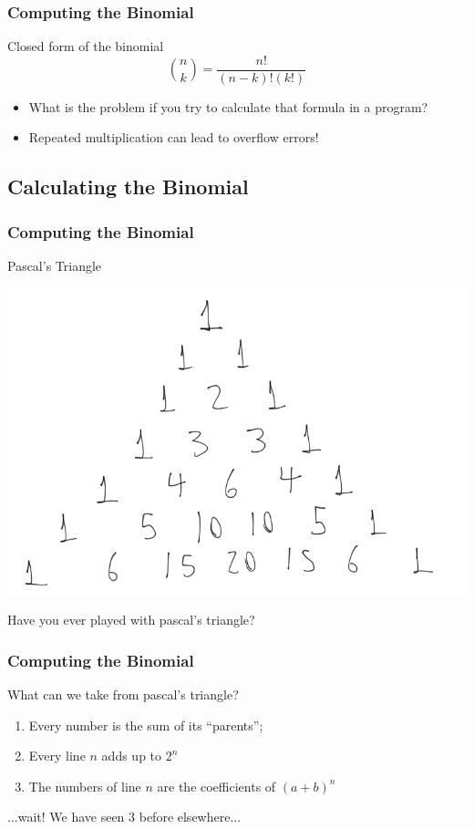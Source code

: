 \documentclass{beamer}
\begin{document}
\begin{frame}
  \frametitle{Computing the Binomial}
  
  \begin{block}{Closed form of the binomial}
    \begin{equation*}
      \binom{n}{k} = \frac{n!}{(n-k)!(k!)}
    \end{equation*}
  \end{block}
  \vfill
  
  \begin{itemize}
  \item What is the problem if you try to calculate that formula in a program?
  \item<2> Repeated multiplication can lead to overflow errors!
  \end{itemize}
\end{frame}

\subsection{Calculating the Binomial}
\begin{frame}
  \frametitle{Computing the Binomial}
  \begin{block}{Pascal's Triangle}
    \begin{center}
      \includegraphics[height=0.7\textheight]{img/Pascal1}
    \end{center}
  \end{block}
  Have you ever played with pascal's triangle?
\end{frame}

\begin{frame}
  \frametitle{Computing the Binomial}
  \begin{block}{What can we take from pascal's triangle?}
    \begin{enumerate}
    \item Every number is the sum of its ``parents'';
    \item Every line $n$ adds up to $2^n$
    \item The numbers of line $n$ are the coefficients of $(a+b)^n$
    \end{enumerate}
  \end{block}
  \begin{block}{...wait!}
    We have seen 3 before elsewhere...
  \end{block}
\end{frame}
\end{document}
